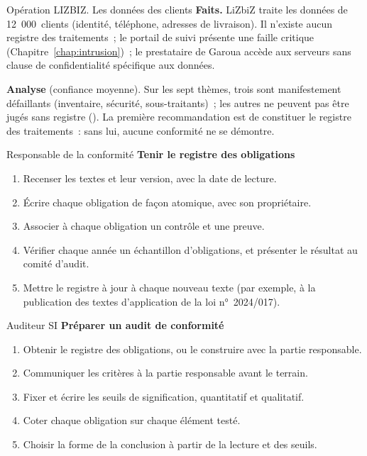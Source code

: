 \begin{boxscenario}{Opération LIZBIZ. Les données des clients}
\textbf{Faits.} LiZbiZ traite les données de 12~000~clients (identité,
téléphone, adresses de livraison). Il n'existe aucun registre des
traitements~; le portail de suivi présente une faille critique
(Chapitre~\ref{chap:intrusion})~; le prestataire de Garoua accède aux
serveurs sans clause de confidentialité spécifique aux données.

\medskip
\textbf{Analyse} (confiance moyenne). Sur les sept thèmes, trois sont
manifestement défaillants (inventaire, sécurité, sous-traitants)~; les
autres ne peuvent pas être jugés sans registre (\NEK{}). La première
recommandation est de constituer le registre des traitements~: sans lui,
aucune conformité ne se démontre.
\end{boxscenario}

\begin{boxmetier}{Responsable de la conformité}
\textbf{Tenir le registre des obligations}
\begin{enumerate}
    \item Recenser les textes et leur version, avec la date de lecture.
    \item Écrire chaque obligation de façon atomique, avec son
          propriétaire.
    \item Associer à chaque obligation un contrôle et une preuve.
    \item Vérifier chaque année un échantillon d'obligations, et présenter
          le résultat au comité d'audit.
    \item Mettre le registre à jour à chaque nouveau texte (par exemple, à
          la publication des textes d'application de la loi n°~2024/017).
\end{enumerate}
\end{boxmetier}

\begin{boxmetier}{Auditeur SI}
\textbf{Préparer un audit de conformité}
\begin{enumerate}
    \item Obtenir le registre des obligations, ou le construire avec la
          partie responsable.
    \item Communiquer les critères à la partie responsable avant le
          terrain.
    \item Fixer et écrire les seuils de signification, quantitatif et
          qualitatif.
    \item Coter chaque obligation sur chaque élément testé.
    \item Choisir la forme de la conclusion à partir de la lecture et des
          seuils.
\end{enumerate}
\end{boxmetier}

